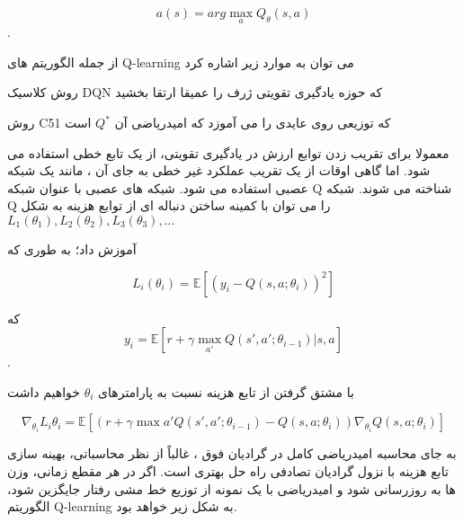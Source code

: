 $$a(s) = arg \max_a Q_{\theta}(s,a)$$.

از جمله الگوریتم های Q-learning می توان به موارد زیر اشاره کرد


روش کلاسیک DQN که حوزه یادگیری تقویتی ژرف را عمیقا ارتقا بخشید

روش C51 که توزیعی روی عایدی را می آموزد که امیدریاضی آن $Q^*$ است


معمولا برای تقریب زدن توابع ارزش در یادگیری تقویتی، از یک تابع خطی استفاده می شود.
اما گاهی اوقات از یک تقریب عملکرد غیر خطی به جای آن ، مانند یک شبکه عصبی استفاده می شود. شبکه های عصبی با عنوان شبکه Q شناخته می شوند.
شبکه Q را می توان با کمینه ساختن دنباله ای از توابع هزینه به شکل 
$L_1(\theta_1), L_2(\theta_2), L_3(\theta_3), ... $

 آموزش داد؛ به طوری که

$$L_i(\theta_i)=\mathbb{E}\left[(y_i - Q(s,a;\theta_i))^2\right]$$

که 
$$y_i = \mathbb{E}[r + \gamma \max_{a'} Q(s',a'; \theta_{i-1})| s,a]$$.

با مشتق گرفتن از تابع هزینه نسبت به پارامترهای
$\theta_i$
 خواهیم داشت

$$\nabla_{\theta_i} L_i{\theta_i} = \mathbb{E}\left[ \left(r + \gamma \max{a'} Q(s',a';\theta_{i-1}) - Q(s,a;\theta_i)\right) \nabla_{\theta_i} Q(s,a;\theta_i)\right]$$



به جای محاسبه امیدریاضی کامل در گرادیان فوق ، غالباً از نظر محاسباتی، بهینه سازی تابع هزینه با نزول گرادیان تصادفی   راه حل بهتری است. اگر در هر مقطع زمانی، وزن ها به روزرسانی شود و امیدریاضی با یک نمونه از توزیع خط مشی رفتار  جایگزین شود، الگوریتم Q-learning به شکل زیر خواهد بود.


